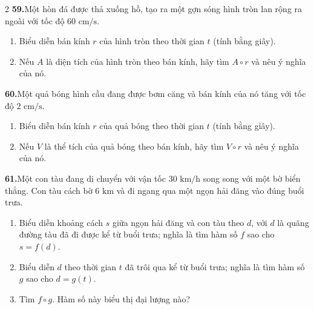 \begin{multicols}{2}
\noindent\textbf{\textsf{\color{stewartcyan}59.}}\quad Một hòn đá được thả xuống hồ, tạo ra một gợn sóng hình tròn lan rộng ra ngoài với tốc độ $60\text{ cm/s}$.
\begin{enumerate}[label=(\alph*),leftmargin=*,itemsep=1pt,topsep=2pt]
    \item Biểu diễn bán kính $r$ của hình tròn theo thời gian $t$ (tính bằng giây).
    \item Nếu $A$ là diện tích của hình tròn theo bán kính, hãy tìm $A \circ r$ và nêu ý nghĩa của nó.
\end{enumerate}

\vspace{1pt}
\noindent\textbf{\textsf{\color{stewartcyan}60.}}\quad Một quả bóng hình cầu đang được bơm căng và bán kính của nó tăng với tốc độ $2\text{ cm/s}$.
\begin{enumerate}[label=(\alph*),leftmargin=*,itemsep=1pt,topsep=2pt]
    \item Biểu diễn bán kính $r$ của quả bóng theo thời gian $t$ (tính bằng giây).
    \item Nếu $V$ là thể tích của quả bóng theo bán kính, hãy tìm $V \circ r$ và nêu ý nghĩa của nó.
\end{enumerate}

\vspace{1pt}
\noindent\textbf{\textsf{\color{stewartcyan}61.}}\quad Một con tàu đang di chuyển với vận tốc $30\text{ km/h}$ song song với một bờ biển thẳng. Con tàu cách bờ $6\text{ km}$ và đi ngang qua một ngọn hải đăng vào đúng buổi trưa.
\begin{enumerate}[label=(\alph*),leftmargin=*,itemsep=1pt,topsep=2pt]
    \item Biểu diễn khoảng cách $s$ giữa ngọn hải đăng và con tàu theo $d$, với $d$ là quãng đường tàu đã đi được kể từ buổi trưa; nghĩa là tìm hàm số $f$ sao cho $s = f(d)$.
    \item Biểu diễn $d$ theo thời gian $t$ đã trôi qua kể từ buổi trưa; nghĩa là tìm hàm số $g$ sao cho $d = g(t)$.
    \item Tìm $f \circ g$. Hàm số này biểu thị đại lượng nào?
\end{enumerate}

\end{multicols}
